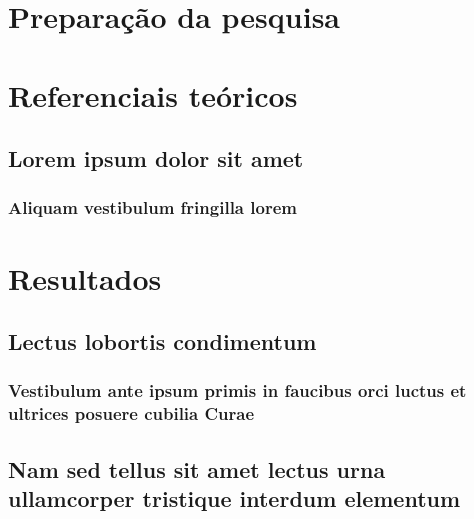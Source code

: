 \part{Preparação da pesquisa}



\part{Referenciais teóricos}

\chapter{Lorem ipsum dolor sit amet}

\section{Aliquam vestibulum fringilla lorem}

\lipsum[1]

\lipsum[2-3]

\part{Resultados}

\chapter{Lectus lobortis condimentum}

\section{Vestibulum ante ipsum primis in faucibus orci luctus et ultrices posuere cubilia Curae}

\lipsum[21-22]

\chapter{Nam sed tellus sit amet lectus urna ullamcorper tristique interdum elementum}

